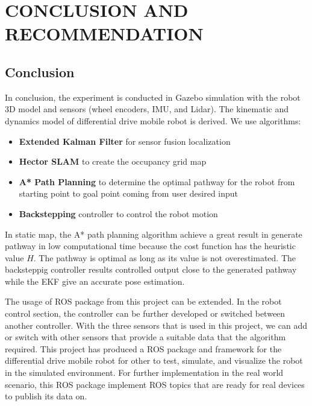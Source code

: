 \section{CONCLUSION AND RECOMMENDATION}
\subsection{Conclusion}
\hspace{1.27cm}
In conclusion, the experiment is conducted in Gazebo simulation with the robot 3D model and sensors (wheel encoders, IMU, and Lidar). The kinematic and dynamics model of differential drive mobile robot is derived. We use algorithms:\par
\begin{itemize}
	\item \textbf{Extended Kalman Filter} for sensor fusion localization
	\item \textbf{Hector SLAM} to create the occupancy grid map
	\item \textbf{A* Path Planning} to determine the optimal pathway for the robot from starting point to goal point coming from user desired input
	\item \textbf{Backstepping} controller to control the robot motion
\end{itemize}

\hspace{1.27cm}
In static map, the A* path planning algorithm achieve a great result in generate pathway in low computational time because the cost function has the heuristic value $H$. The pathway is optimal as long as its value is not overestimated. The backsteppig controller results controlled output close to the generated pathway while the EKF give an accurate pose estimation.\par

\hspace{1.27cm}
The usage of ROS package from this project can be extended. In the robot control section, the controller can be further developed or switched between another controller. With the three sensors that is used in this project, we can add or switch with other sensors that provide a suitable data that the algorithm required. This project has produced a ROS package and framework for the differential drive mobile robot for other to test, simulate, and visualize the robot in the simulated environment. For further implementation in the real world scenario, this ROS package implement ROS topics that are ready for real devices to publish its data on. \par


